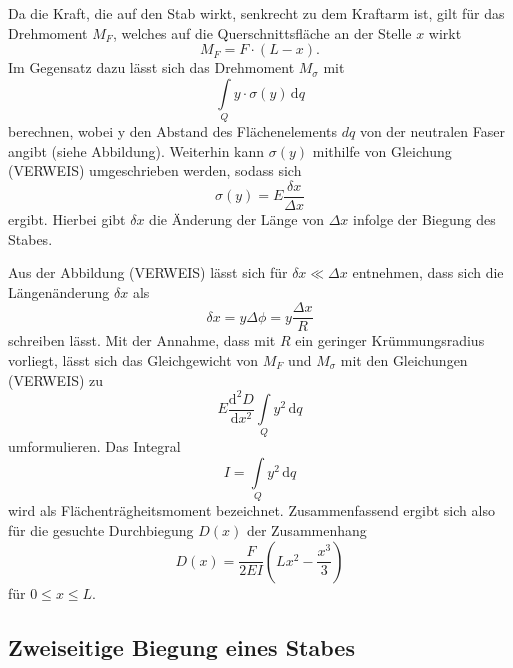 Da die Kraft, die auf den Stab wirkt, senkrecht 
zu dem Kraftarm ist, gilt für das Drehmoment 
$M_F$, welches auf die Querschnittsfläche an der
Stelle $x$ wirkt
\begin{equation}
    M_F = F \cdot (L-x).
\end{equation}
\noindent
Im Gegensatz dazu lässt sich das Drehmoment 
$M_{\sigma}$ mit 
\begin{equation}
    \int\limits_Q \! y \cdot \sigma (y) \, \mathrm{d}q
\end{equation}
\noindent berechnen, wobei y den Abstand des 
Flächenelements $dq$ von der neutralen Faser
angibt (siehe Abbildung). Weiterhin kann $\sigma (y)$
mithilfe von Gleichung (VERWEIS) umgeschrieben werden,
sodass sich 
\begin{equation}
    \sigma (y) = E \frac{\delta x}{\Delta x}
\end{equation}
\noindent ergibt. Hierbei gibt $\delta x$ die 
Änderung der Länge von $\Delta x$ infolge der
Biegung des Stabes.
 
Aus der Abbildung (VERWEIS) lässt sich für 
$\delta x \ll \Delta x$ entnehmen, dass sich 
die Längenänderung $\delta x$ als 
\begin{equation}
    \delta x = y \Delta \phi = y \frac{\Delta x}{R}
\end{equation}
\noindent schreiben lässt. Mit der Annahme, dass mit 
$R$ ein geringer Krümmungsradius vorliegt, lässt sich
das Gleichgewicht von $M_F$ und $M_{\sigma}$ mit den
Gleichungen (VERWEIS) zu 
\begin{equation}
    E \frac{\mathrm{d}^2 D}{\mathrm{d} x^2} \int\limits_Q \! y^2\, \mathrm{d}q
\end{equation}
\noindent umformulieren. Das Integral
\begin{equation}
    I = \int\limits_Q \! y^2\, \mathrm{d}q
\end{equation}
\noindent wird als Flächenträgheitsmoment bezeichnet.
Zusammenfassend ergibt sich also für die gesuchte 
Durchbiegung $D(x)$ der Zusammenhang
\begin{equation}
    D(x) = \frac{F}{2 E I} \left( L x^2 - \frac{x^3}{3} \right)
\end{equation}
\noindent für $0 \leq x \leq L$.




\subsection{Zweiseitige Biegung eines Stabes}

